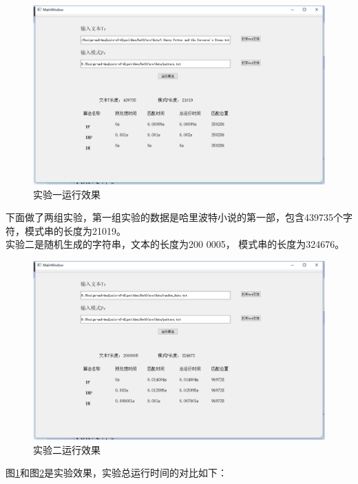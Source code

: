 \documentclass[UTF8]{ctexart}
\begin{document}
\begin{figure}[H]
    \centering
    \includegraphics[width=1\textwidth]{img/result1.png}
    \caption{实验一运行效果}
    \label{result1}
\end{figure}

下面做了两组实验，第一组实验的数据是哈里波特小说的第一部，包含439735个字符，模式串的长度为21019。\\
实验二是随机生成的字符串，文本的长度为200 0005， 模式串的长度为324676。

\begin{figure}[H]
    \centering
    \includegraphics[width=1\textwidth]{img/result2.png}
    \caption{实验二运行效果}
    \label{result2}
\end{figure}

图\ref{result1}和图\ref{result2}是实验效果，实验总运行时间的对比如下：
\end{document}
